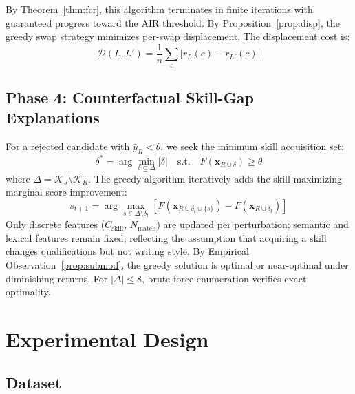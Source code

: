 \documentclass{svproc}
\begin{document}
By Theorem~\ref{thm:fcr}, this algorithm terminates in finite iterations with guaranteed progress toward the AIR threshold. By Proposition~\ref{prop:disp}, the greedy swap strategy minimizes per-swap displacement. The displacement cost is:
\begin{equation}
    \mathcal{D}(L, L') = \frac{1}{n}\sum_{c} |r_L(c) - r_{L'}(c)|
\end{equation}

\subsection{Phase 4: Counterfactual Skill-Gap Explanations}

For a rejected candidate with $\hat{y}_R < \theta$, we seek the minimum skill acquisition set:
\begin{equation}
    \delta^* = \arg\min_{\delta \subseteq \Delta} |\delta| \quad \text{s.t.} \quad F(\mathbf{x}_{R \cup \delta}) \geq \theta
\end{equation}
where $\Delta = \mathcal{K}_J \setminus \mathcal{K}_R$. The greedy algorithm iteratively adds the skill maximizing marginal score improvement:
\begin{equation}
    s_{t+1} = \arg\max_{s \in \Delta \setminus \delta_t} \left[ F(\mathbf{x}_{R \cup \delta_t \cup \{s\}}) - F(\mathbf{x}_{R \cup \delta_t}) \right]
\end{equation}
Only discrete features ($C_\text{skill}$, $N_\text{match}$) are updated per perturbation; semantic and lexical features remain fixed, reflecting the assumption that acquiring a skill changes qualifications but not writing style. By Empirical Observation~\ref{prop:submod}, the greedy solution is optimal or near-optimal under diminishing returns. For $|\Delta| \leq 8$, brute-force enumeration verifies exact optimality.

\section{Experimental Design}\label{sec:experiment}

\subsection{Dataset}
\end{document}
